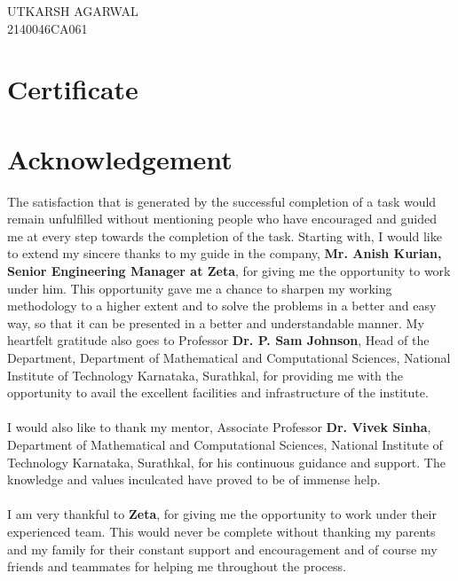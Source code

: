 \documentclass[12pt,a4paper]{report}
\begin{document}
\vspace{1cm}

\begin{flushright}
UTKARSH AGARWAL \\
2140046CA061
\end{flushright}


\chapter*{Certificate}

\chapter*{Acknowledgement}

The satisfaction that is generated by the successful completion of a task would remain unfulfilled without mentioning people who have encouraged and guided me at every step towards the completion of the task. Starting with, I would like to extend my sincere thanks to my guide in the company, \textbf{Mr. Anish Kurian, Senior Engineering Manager at Zeta}, for giving me the opportunity to work under him. This opportunity gave me a chance to sharpen my working methodology to a higher extent and to solve the problems in a better and easy way, so that it can be presented in a better and understandable manner. My heartfelt gratitude also goes to Professor \textbf{Dr. P. Sam Johnson}, Head of the Department, Department of Mathematical and Computational Sciences, National Institute of Technology Karnataka, Surathkal, for providing me with the opportunity to avail the excellent facilities and infrastructure of the institute.
\\\\
\noindent I would also like to thank my mentor, Associate Professor \textbf{Dr. Vivek Sinha}, Department of Mathematical and Computational Sciences, National Institute of Technology Karnataka, Surathkal, for his continuous guidance and support. The knowledge and values inculcated have proved to be of immense help.
\\\\
\noindent I am very thankful to \textbf{Zeta}, for giving me the opportunity to work under their experienced team. This would never be complete without thanking my parents and my family for their constant support and encouragement and of course my friends and teammates for helping me throughout the process.
\end{document}
